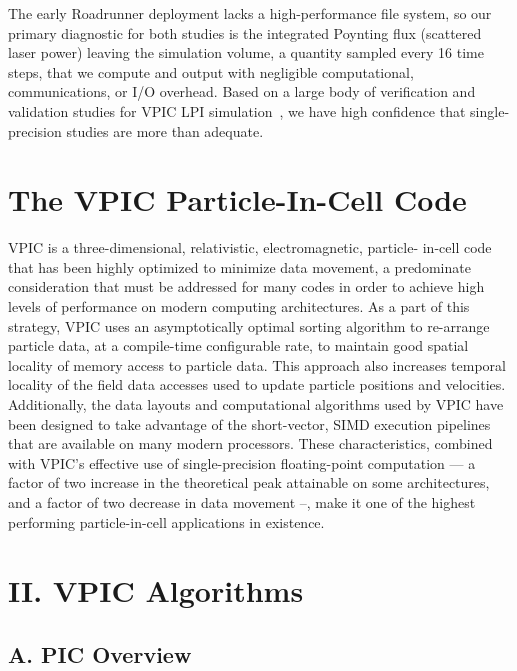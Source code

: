 \documentclass[letter,10pt]{article}
\begin{document}
The early Roadrunner deployment lacks a high-performance file system, so our primary 
diagnostic for both studies is the integrated Poynting flux (scattered laser power) 
leaving the simulation volume, a quantity sampled every 16 time steps, that we compute 
and output with negligible computational, communications, or I/O overhead.  Based 
on a large body of verification and validation studies 
for VPIC LPI simulation~\cite{}, we have high confidence that single-precision studies 
are more than adequate. 


\section*{The VPIC Particle-In-Cell Code}

VPIC is a three-dimensional, relativistic, electromagnetic, particle-
in-cell code that has been highly optimized to minimize data movement, 
a predominate consideration that must be addressed for many codes in 
order to achieve high levels of performance on modern computing 
architectures.  As a part of this strategy, VPIC uses an 
asymptotically optimal sorting algorithm to re-arrange particle data, 
at a compile-time configurable rate, to maintain good spatial locality 
of memory access to particle data.  This approach also increases 
temporal locality of the field data accesses used to update particle 
positions and velocities.  Additionally, the data layouts and 
computational algorithms used by VPIC have been designed to take 
advantage of the short-vector, SIMD execution pipelines that are 
available on many modern processors.  These characteristics, combined 
with VPIC's effective use of single-precision floating-point 
computation --- a factor of two increase in the theoretical peak 
attainable on some architectures, and a factor of two decrease in data 
movement --, make it one of the highest performing particle-in-cell 
applications in existence.




\section{
II. VPIC Algorithms}

\subsection{A. PIC Overview}
\end{document}
